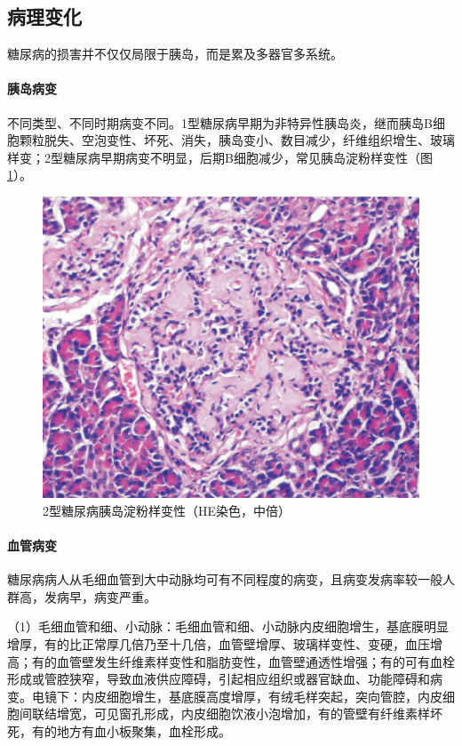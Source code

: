 \subsection{病理变化}

糖尿病的损害并不仅仅局限于胰岛，而是累及多器官多系统。

\paragraph{胰岛病变}
不同类型、不同时期病变不同。1型糖尿病早期为非特异性胰岛炎，继而胰岛B细胞颗粒脱失、空泡变性、坏死、消失，胰岛变小、数目减少，纤维组织增生、玻璃样变；2型糖尿病早期病变不明显，后期B细胞减少，常见胰岛淀粉样变性（图\ref{fig12-7}）。

\begin{figure}[!htbp]
 \centering
 \includegraphics{./images/Image00215.jpg}
 \captionsetup{justification=centering}
 \caption{2型糖尿病胰岛淀粉样变性（HE染色，中倍）}
 \label{fig12-7}
  \end{figure} 

\paragraph{血管病变}
糖尿病病人从毛细血管到大中动脉均可有不同程度的病变，且病变发病率较一般人群高，发病早，病变严重。

（1）毛细血管和细、小动脉：毛细血管和细、小动脉内皮细胞增生，基底膜明显增厚，有的比正常厚几倍乃至十几倍，血管壁增厚、玻璃样变性、变硬，血压增高；有的血管壁发生纤维素样变性和脂肪变性，血管壁通透性增强；有的可有血栓形成或管腔狭窄，导致血液供应障碍，引起相应组织或器官缺血、功能障碍和病变。电镜下：内皮细胞增生，基底膜高度增厚，有绒毛样突起，突向管腔，内皮细胞间联结增宽，可见窗孔形成，内皮细胞饮液小泡增加，有的管壁有纤维素样坏死，有的地方有血小板聚集，血栓形成。

